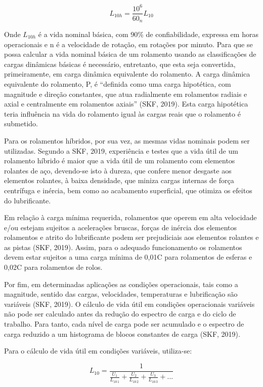 \documentclass[
	12pt,				
	oneside,			
	a4paper,			
	english,			
	brazil,			
	]{abntex2ppgsi}
\begin{document}
\begin{equation}
	L_{10h}= \frac{10^{6}}{60_{n}}L_{10}
	\label{eq: Vida Útil em Horas}
\end{equation}

Onde $L_{10h}$ é a vida nominal básica, com 90\% de confiabilidade, expressa em horas operacionais e n é a velocidade de rotação, em rotações por minuto. 
Para que se possa calcular a vida nominal básica de um rolamento usando as classificações de cargas dinâmicas básicas é necessário, entretanto, que esta seja convertida, primeiramente, em carga dinâmica equivalente do rolamento. A carga dinâmica equivalente do rolamento, P, é “definida como uma carga hipotética, com magnitude e direção constantes, que atua radialmente em rolamentos radiais e axial e centralmente em rolamentos axiais” (SKF, 2019). Esta carga hipotética teria influência na vida do rolamento igual às cargas reais que o rolamento é submetido.

Para os rolamentos híbridos, por sua vez, as mesmas vidas nominais podem ser utilizadas. Segundo a SKF, 2019, experiência e testes que a vida útil de um rolamento híbrido é maior que a vida útil de um rolamento com elementos rolantes de aço, devendo-se isto à dureza, que confere menor desgaste aos elementos rolantes, à baixa densidade, que miniza cargas internas de força centrífuga e inércia, bem como ao acabamento superficial, que otimiza os efeitos do lubrificante.

Em relação à carga mínima requerida, rolamentos que operem em alta velocidade e/ou estejam sujeitos a acelerações bruscas, forças de inércia dos elementos rolamentos e atrito do lubrificante podem ser prejudiciais aos elementos rolantes e as pistas (SKF, 2019). Assim, para o adequado funcionamento os rolamentos devem estar sujeitos a uma carga mínima de 0,01C para rolamentos de esferas e 0,02C para rolamentos de rolos. 

Por fim, em determinadas aplicações as condições operacionais, tais como a magnitude, sentido das cargas, velocidades, temperaturas e lubrificação são variáveis (SKF, 2019). O cálculo de vida útil em condições operacionais variáveis não pode ser calculado antes da redução do espectro de carga e do ciclo de trabalho. Para tanto, cada nível de carga pode ser acumulado e o espectro de carga reduzido a um histograma de blocos constantes de carga (SKF, 2019).

Para o cálculo de vida útil em condições variáveis, utiliza-se:

\begin{equation}
	L_{10}= \frac{1}{ \frac{U_{1}}{L_{10 \,1}} + \frac{U_{2}}{L_{10 \,2}} + \frac{U_{3}}{L_{10 \,3}} + ...}
	\label{eq:Calculo da vida Util em condições variaveis}
\end{equation}
\end{document}
